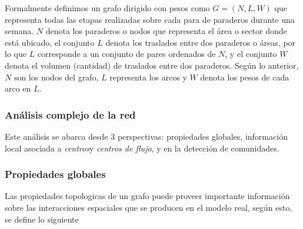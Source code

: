 \documentclass[12pt]{article}
\begin{document}
	Formalmente definimos un grafo dirigido con pesos como $G=(N,L,W)$ que representa todas las etapas realizadas sobre cada para de paraderos durante una semana. $N$ denota los paraderos o nodos que representa el área o sector donde está ubicado, el conjunto $L$ denota los traslados entre dos paraderos o áreas, por lo que $L$ corresponde a un conjunto de pares ordenados de $N$, y el conjunto $W$ denota el volumen (cantidad) de traslados entre dos paraderos. Según lo anterior, $N$ son los nodos del grafo, $L$ representa los arcos y $W$ denota los pesos de cada arco en $L$.
	
	\subsubsection{Análisis complejo de la red}    

Este análisis se abarca desde 3 perspectivas: propiedades globales, información local asociada a \textit{centros}y \textit{centros de flujo}, y en la detección de comunidades. 

	\subsubsection{Propiedades globales}

Las propiedades topologicas de un grafo puede proveer importante información sobre las interacciones espaciales que se producen en el modelo real, según esto, se define lo siguiente
\end{document}
